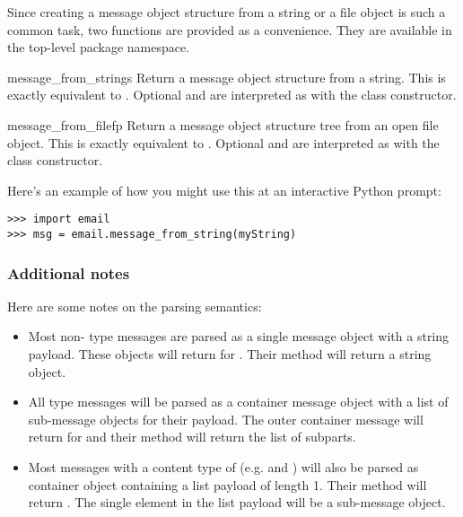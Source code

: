 Since creating a message object structure from a string or a file
object is such a common task, two functions are provided as a
convenience.  They are available in the top-level 
package namespace.

\begin{funcdesc}{message_from_string}{s}
Return a message object structure from a string.  This is exactly
equivalent to .  Optional  and
 are interpreted as with the  class constructor.

\end{funcdesc}

\begin{funcdesc}{message_from_file}{fp}
Return a message object structure tree from an open file object.  This
is exactly equivalent to .  Optional
 and  are interpreted as with the
 class constructor.

\end{funcdesc}

Here's an example of how you might use this at an interactive Python
prompt:

\begin{verbatim}
>>> import email
>>> msg = email.message_from_string(myString)
\end{verbatim}

\subsubsection{Additional notes}

Here are some notes on the parsing semantics:

\begin{itemize}
\item Most non- type messages are parsed as a single
      message object with a string payload.  These objects will return
       for .  Their
       method will return a string object.

\item All  type messages will be parsed as a
      container message object with a list of sub-message objects for
      their payload.  The outer container message will return
       for  and their
       method will return the list of
       subparts.

\item Most messages with a content type of 
      (e.g.  and
      ) will also be parsed as container
      object containing a list payload of length 1.  Their
       method will return .  The
      single element in the list payload will be a sub-message object.
\end{itemize}
